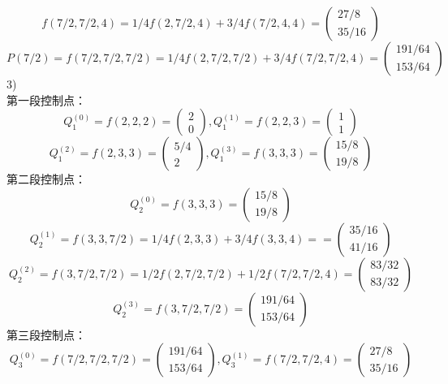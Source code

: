 \documentclass{article}
\begin{document}
	$$f(7/2,7/2,4)=1/4f(2,7/2,4)+3/4f(7/2,4,4)=\left(\begin{array}{c} 27/8\\35/16 \end{array}\right)$$
	$$P(7/2)=f(7/2,7/2,7/2)=1/4f(2,7/2,7/2)+3/4f(7/2,7/2,4)=\left(\begin{array}{c} 191/64\\153/64\end{array}\right)$$
	3)\\
	第一段控制点：\\
	$$Q_1^{(0)}=f(2,2,2)=\left(\begin{array}{c} 2\\0 \end{array}\right),Q_1^{(1)}=f(2,2,3)=\left(\begin{array}{c} 1\\1 \end{array}\right)$$
	$$Q_1^{(2)}=f(2,3,3)=\left(\begin{array}{c} 5/4\\2 \end{array}\right),Q_1^{(3)}=f(3,3,3)=\left(\begin{array}{c} 15/8\\19/8 \end{array}\right)$$
	第二段控制点：\\
	$$Q_2^{(0)}=f(3,3,3)=\left(\begin{array}{c} 15/8\\19/8 \end{array}\right)$$
	$$Q_2^{(1)}=f(3,3,7/2)=1/4f(2,3,3)+3/4f(3,3,4)==\left(\begin{array}{c} 35/16\\41/16 \end{array}\right)$$
	$$Q_2^{(2)}=f(3,7/2,7/2)=1/2f(2,7/2,7/2)+1/2f(7/2,7/2,4)=\left(\begin{array}{c} 83/32\\83/32 \end{array}\right)$$
	$$Q_2^{(3)}=f(3,7/2,7/2)=\left(\begin{array}{c} 191/64\\153/64 \end{array}\right)$$
	第三段控制点：\\
	$$Q_3^{(0)}=f(7/2,7/2,7/2)=\left(\begin{array}{c} 191/64\\153/64 \end{array}\right),
	Q_3^{(1)}=f(7/2,7/2,4)=\left(\begin{array}{c} 27/8\\35/16 \end{array}\right)$$
\end{document}
